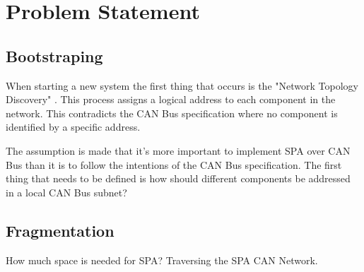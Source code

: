 \section{Problem Statement}\label{ch:problem_statement}
\subsection{Bootstraping}
When starting a new system the first thing that occurs is the "Network Topology
Discovery" \cite{standard:spa_networking}. This process assigns a logical
address to each component in the network. This contradicts the CAN Bus
specification where no component is identified by a specific address.

The assumption is made that it's more important to implement SPA over CAN Bus
than it is to follow the intentions of the CAN Bus specification. The first
thing that needs to be defined is how should different components be addressed
in a local CAN Bus subnet?

\subsection{}

\subsection{Fragmentation}
How much space is needed for SPA? Traversing the SPA CAN Network.
